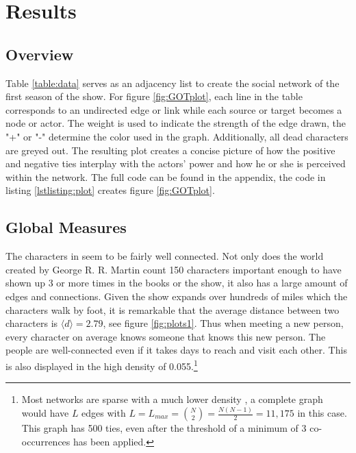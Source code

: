\section{Results} \label{sec:results}
\subsection{Overview}
Table \ref{table:data} serves as an adjacency list to create the social network of the first season of the show. For figure \ref{fig:GOTplot}, each line in the table corresponds to an undirected edge or link while each source or target becomes a node or actor. The weight is used to indicate the strength of the edge drawn, the "+" or "-" determine the color used in the graph. Additionally, all dead characters are greyed out.
The resulting plot creates a concise picture of how the positive and negative ties interplay with the actors’ power and how he or she is perceived within the network.
The full code can be found in the appendix, the code in listing \ref{lstlisting:plot} creates figure \ref{fig:GOTplot}.\\



\subsection{Global Measures}
The characters in \got seem to be fairly well connected. Not only does the world created by George R. R. Martin count 150 characters important enough to have shown up 3 or more times in the books or the show, it also has a large amount of edges and connections. Given the show expands over hundreds of miles which the characters walk by foot, it is remarkable that the average distance between two characters is $\langle d \rangle = 2.79$, see figure \ref{fig:plots1}. Thus when meeting a new person, every character on average knows someone that knows this new person. The people are well-connected even if it takes days to reach and visit each other. This is also displayed in the high density of 0.055.\footnote{Most networks are sparse with a much lower density \citep{RevModPhys.74.47}, a complete graph would have $L$ edges with $L=L_{max} = \binom{N}{2} = \tfrac{N(N-1)}{2} = 11,175$ in this case. This graph has 500 ties, even after the threshold of a minimum of 3 co-occurrences has been applied.}

